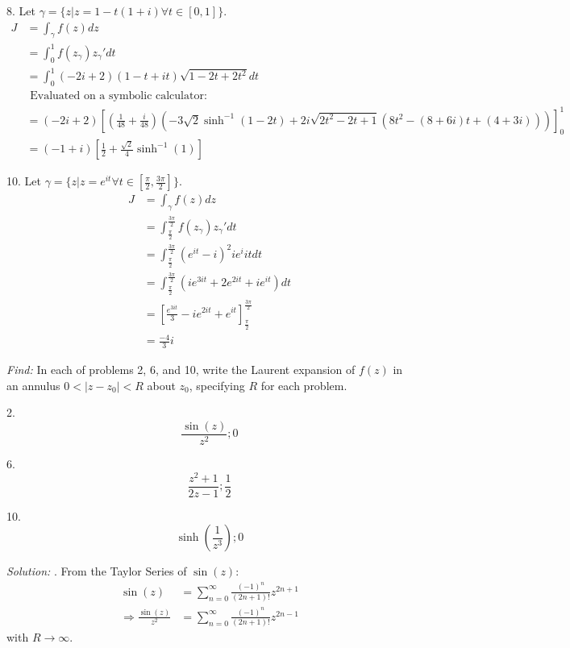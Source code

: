 \documentclass[11pt]{homework}
\begin{document}
8. Let $\gamma = \{z | z = 1-t(1+i) \forall t\in[ 0, 1]\}$.
\begin{align*}
  J &= \int_\gamma f(z) dz \\
    &= \int_0^{1} f(z_\gamma) z_\gamma' dt   \\
    &= \int_0^{1} (-2i+2) (1-t+it) \sqrt{1-2t+2t^2} dt   \\
&\text{ Evaluated on a symbolic calculator:} \\
  &= (-2i+2)
    \left[ 
      \left(\frac{1}{48}+\frac{i}{48}\right)  
      \left(-3\sqrt{2}\sinh^{-1}(1-2t) + 2i \sqrt{2t^2-2t+1}
        (8t^2-(8+6i)t +(4+3i))\right)
    \right]_0^1 \\
  &= (-1+i)
  \left[ 
    \frac{1}{2} + \frac{ \sqrt{2}}{4}\sinh^{-1}(1)
  \right]
\end{align*}


10. Let $\gamma = \{z | z = e^{it} \forall t\in[\frac{\pi}{2},\frac{3\pi}{2}]\}$.
\begin{align*}
  J &= \int_\gamma f(z) dz \\
    &= \int_\frac{\pi}{2}^{\frac{3\pi}{2}} f(z_\gamma) z_\gamma' dt   \\
    &= \int_\frac{\pi}{2}^{\frac{3\pi}{2}} (e^{it} - i)^2 ie^i{it} dt \\
    &= \int_\frac{\pi}{2}^{\frac{3\pi}{2}} (ie^{3it} + 2e^{2it} +ie^{it}) dt \\
    &= \left[ \frac{e^{3it}}{3} - i e^{2it} + e^{it} \right]_\frac{\pi}{2}^\frac{3\pi}{2} \\
    &= \frac{-4}{3}i
\end{align*}

\newpage
{}
\emph{Find:}
In each of problems 2, 6, and 10,
write the Laurent expansion of $f(z)$ in an annulus $0<|z-z_0|<R$
about $z_0$, specifying $R$ for each problem. 

2.
\begin{equation*}
  \frac{\sin(z)}{z^2}; 0
\end{equation*}

6.
\begin{equation*}
  \frac{z^2+1}{2z-1}; \frac{1}{2}
\end{equation*}

10.
\begin{equation*}
  \sinh(\frac{1}{z^3}); 0
\end{equation*}

\emph{Solution:}
. From the Taylor Series of $\sin(z)$:
\begin{align*}
\sin(z) &= \sum_{n=0}^\infty \frac{ (-1)^n}{(2n+1)!} z^{2n+1} \\
\Rightarrow 
  \frac{ \sin(z)}{z^2} &= \sum_{n=0}^\infty \frac{ (-1)^n}{(2n+1)!} z^{2n-1} 
\end{align*}
\noindent
with $R\rightarrow \infty$.
\end{document}
